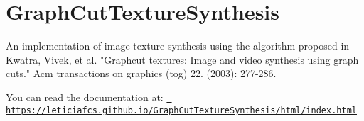 \chapter{Graph\+Cut\+Texture\+Synthesis}
\hypertarget{index}{}\label{index}
\label{index_md__2home_2leticiafcs_2tcc_2GraphCutTextureSynthesis_2README}%
%
An implementation of image texture synthesis using the algorithm proposed in \textquotesingle{}Kwatra, Vivek, et al. "{}\+Graphcut textures\+: Image and video synthesis using graph cuts."{} Acm transactions on graphics (tog) 22. (2003)\+: 277-\/286.\textquotesingle{}

You can read the documentation at\+: \href{https://leticiafcs.github.io/GraphCutTextureSynthesis/html/index.html}{\texttt{ https\+://leticiafcs.\+github.\+io/\+Graph\+Cut\+Texture\+Synthesis/html/index.\+html}} 